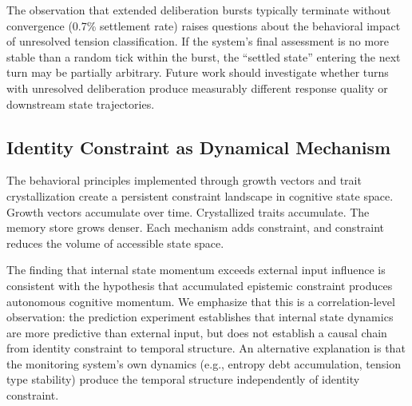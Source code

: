 \documentclass[twoside,11pt]{article}
\begin{document}
The observation that extended deliberation bursts typically terminate without
convergence (0.7\% settlement rate) raises questions about the behavioral
impact of unresolved tension classification. If the system's final assessment
is no more stable than a random tick within the burst, the ``settled state''
entering the next turn may be partially arbitrary. Future work should
investigate whether turns with unresolved deliberation produce measurably
different response quality or downstream state trajectories.

\subsection{Identity Constraint as Dynamical Mechanism}
\label{sec:discuss-identity}

The behavioral principles implemented through growth vectors and trait
crystallization create a persistent constraint landscape in cognitive state
space. Growth vectors accumulate over time. Crystallized traits accumulate.
The memory store grows denser. Each mechanism adds constraint, and constraint
reduces the volume of accessible state space.

The finding that internal state momentum exceeds external input influence is
consistent with the hypothesis that accumulated epistemic constraint produces
autonomous cognitive momentum. We emphasize that this is a correlation-level
observation: the prediction experiment establishes that internal state dynamics
are more predictive than external input, but does not establish a causal chain
from identity constraint to temporal structure. An alternative explanation is
that the monitoring system's own dynamics (e.g., entropy debt accumulation,
tension type stability) produce the temporal structure independently of identity
constraint.
\end{document}
